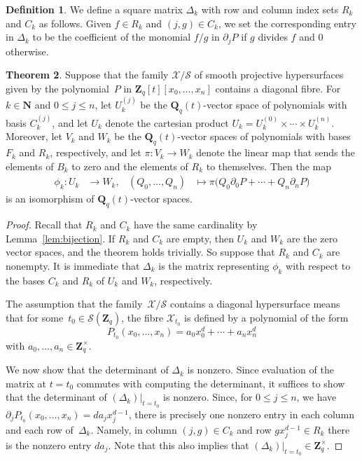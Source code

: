 \documentclass[a4paper,11pt]{article}
\numberwithin{equation}{section}
\newcommand{\NN}{\mathbf{N}} %
\newcommand{\ZZ}{\mathbf{Z}} %
\newcommand{\QQ}{\mathbf{Q}} %
\renewcommand{\to}{\rightarrow}        %
\theoremstyle{definition}
\newtheorem{thm}{Theorem}[section]
\newtheorem{defn}[thm]{Definition}
\begin{document}
\begin{defn} \label{defn:Deltak}
We define a square matrix $\Delta_k$ with 
row and column index sets $R_k$ and $C_k$ as follows.  
Given $f \in R_k$ and $(j,g) \in C_k$, we set the corresponding entry in 
$\Delta_k$ to be the coefficient of the monomial $f/g$ in $\partial_j P$ if 
$g$ divides $f$ and $0$ otherwise.
\end{defn}

\begin{thm} \label{thm:Isomorphism}
Suppose that the family $\mathcal{X}/\mathcal{S}$ of smooth projective
hypersurfaces given by the polynomial~$P$ in $\ZZ_q[t][x_0, \dotsc, x_n]$ contains 
a diagonal fibre.  For $k \in \NN$ and $0 \leq j \leq n$, let $U_k^{(j)}$ be 
the $\QQ_q(t)$-vector space of polynomials with basis $C_k^{(j)}$, and let $U_k$ 
denote the cartesian product $U_k = U_k^{(0)} \times \dotsb \times U_k^{(n)}$. 
Moreover, let $V_k$ and $W_k$ be the $\QQ_q(t)$-vector spaces of polynomials with 
bases $F_k$ and $R_k$, respectively, and let $\pi \colon V_k \rightarrow W_k$ 
denote the linear map that sends the elements of $B_k$ to zero and the 
elements of $R_k$ to themselves. %
Then the map 
\begin{align}
\phi_k \colon U_k &\to W_k,
&(Q_0, \dotsc, Q_n) &\mapsto \pi \bigl( Q_0 \partial_0 P + \dotsb + Q_n \partial_n P \bigr)
\end{align}
is an isomorphism of $\QQ_q(t)$-vector spaces.
\end{thm}

\begin{proof}
Recall that $R_k$ and $C_k$ have the same cardinality by Lemma~\ref{lem:bijection}.
If $R_k$ and $C_k$ are empty, then $U_k$ and $W_k$ are the zero vector spaces, 
and the theorem holds trivially. So suppose that $R_k$ and $C_k$ are nonempty. 
It is immediate that $\Delta_k$ is the matrix 
representing $\phi_k$ with respect to the bases $C_k$ and $R_k$ of $U_k$ and $W_k$, 
respectively.

The assumption that the family~$\mathcal{X}/\mathcal{S}$ contains a diagonal 
hypersurface means that for some~$t_0 \in \mathcal{S}(\ZZ_q)$, 
the fibre $\mathcal{X}_{t_0}$ is defined by a polynomial of the form 
\begin{equation*}
P_{t_0}(x_0, \dotsc, x_n) = a_0 x_0^d + \dotsb + a_n x_n^d
\end{equation*}
with $a_0, \dotsc, a_n \in \ZZ_q^{\times}$.

We now show that the determinant of $\Delta_k$ is nonzero.  Since 
evaluation of the matrix at \mbox{$t = t_0$} commutes with computing the 
determinant, it suffices to show that the determinant of 
$(\Delta_k) \big |_{t=t_0}$ is nonzero. Since, for $0 \leq j \leq n$, 
we have $\partial_j P_{t_0} (x_0, \dotsc, x_n) = d a_j x_j^{d-1}$, there is 
precisely one nonzero entry in each column and each row of~$\Delta_k$.  
Namely, in column $(j, g) \in C_k$ and row $g x_j^{d-1} \in R_k$ there is 
the nonzero entry $d a_j$. Note that this also implies that 
$(\Delta_k) \big |_{t=t_0} \in \ZZ_{q}^{\times}$.
\end{proof}
\end{document}
